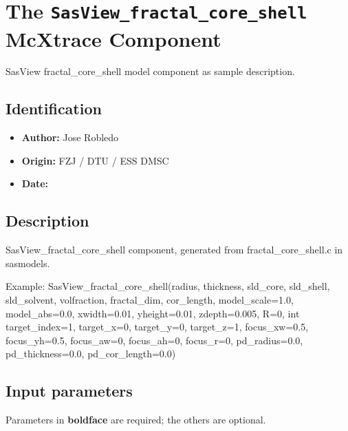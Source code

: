 \section{The \texttt{SasView\_fractal\_core\_shell} McXtrace Component}
SasView fractal\_core\_shell model component as sample description.

\subsection*{Identification}
\begin{itemize}
  \item \textbf{Author:} Jose Robledo
  \item \textbf{Origin:} FZJ / DTU / ESS DMSC
  \item \textbf{Date:} 
\end{itemize}

\subsection*{Description}
SasView\_fractal\_core\_shell component, generated from fractal\_core\_shell.c in sasmodels.

Example: SasView\_fractal\_core\_shell(radius, thickness, sld\_core, sld\_shell, sld\_solvent, volfraction, fractal\_dim, cor\_length, model\_scale=1.0, model\_abs=0.0, xwidth=0.01, yheight=0.01, zdepth=0.005, R=0, int target\_index=1, target\_x=0, target\_y=0, target\_z=1, focus\_xw=0.5, focus\_yh=0.5, focus\_aw=0, focus\_ah=0, focus\_r=0, pd\_radius=0.0, pd\_thickness=0.0, pd\_cor\_length=0.0)

\subsection*{Input parameters}
Parameters in \textbf{boldface} are required; the others are optional.

